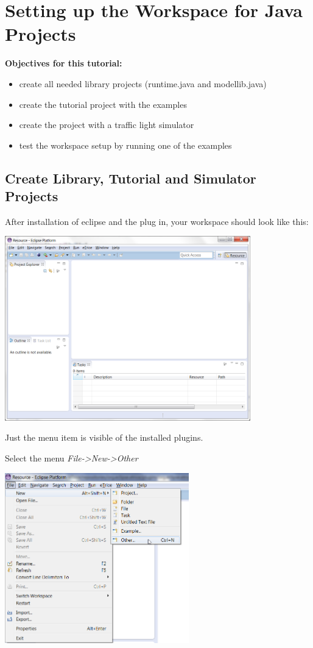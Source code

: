 \section{Setting up the Workspace for Java Projects}

\textbf{Objectives for this tutorial:}
\begin{itemize}
	\item create all needed library projects (runtime.java and modellib.java)
	\item create the tutorial project with the examples
	\item create the project with a traffic light simulator
	\item test the workspace setup by running one of the examples
\end{itemize}

\subsection{Create Library, Tutorial and Simulator Projects}

After installation of eclipse and the \eTrice{} plug in, your workspace should look like this:  

\includegraphics[width=0.8\textwidth]{images/013-SetupWorkspace01.png}

\newpage
Just the \eTrice{} menu item is visible of the installed \eTrice{} plugins.

Select the menu \emph{File->New->Other}

\includegraphics[width=0.6\textwidth]{images/013-SetupWorkspace02.png}

